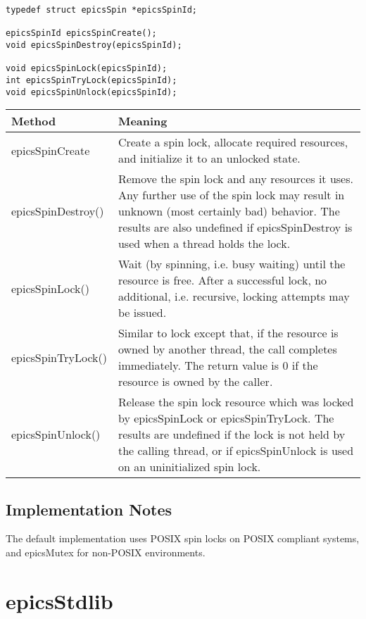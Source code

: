 \begin{verbatim}
typedef struct epicsSpin *epicsSpinId;

epicsSpinId epicsSpinCreate();
void epicsSpinDestroy(epicsSpinId);

void epicsSpinLock(epicsSpinId);
int epicsSpinTryLock(epicsSpinId);
void epicsSpinUnlock(epicsSpinId);
\end{verbatim}

\begin{center}
\begin{longtable}{p{1.38889in}p{5.0in}}
\textbf{Method} & \textbf{Meaning}\\
\hline
epicsSpinCreate & Create a spin lock, allocate required resources, and initialize it to an unlocked state.\\
epicsSpinDestroy() & Remove the spin lock and any resources it uses. Any further use of the spin lock may result in unknown (most certainly bad) behavior. The results are also undefined if epicsSpinDestroy is used when a thread holds the lock.\\
epicsSpinLock() & Wait (by spinning, i.e. busy waiting) until the resource is free. After a successful lock, no additional, i.e. recursive, locking attempts may be issued.\\
epicsSpinTryLock() & Similar to lock except that, if the resource is owned by another thread, the call completes immediately. The return value is 0 if the resource is owned by the caller.\\
epicsSpinUnlock() & Release the spin lock resource which was locked by epicsSpinLock or epicsSpinTryLock. The results are undefined if the lock is not held by the calling thread, or if epicsSpinUnlock is used on an uninitialized spin lock.\\
\end{longtable}
\end{center}

\subsection{Implementation Notes}

The default implementation uses POSIX spin locks on POSIX compliant systems, and epicsMutex for non-POSIX environments.


\section{epicsStdlib}

